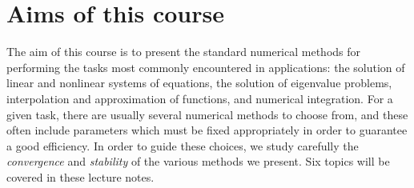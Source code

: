 \section*{Aims of this course}%
\label{sec:aims_of_this_course}

The aim of this course is to present the standard numerical methods for performing the tasks most commonly encountered in applications:
the solution of linear and nonlinear systems of equations,
the solution of eigenvalue problems,
interpolation and approximation of functions,
and numerical integration.
For a given task,
there are usually several numerical methods to choose from,
and these often include parameters which must be fixed appropriately in order to guarantee a good efficiency.
In order to guide these choices,
we study carefully the \emph{convergence} and \emph{stability} of the various methods we present.
Six topics will be covered in these lecture notes.
